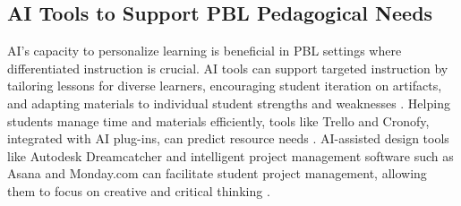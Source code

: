\subsection{AI Tools to Support PBL Pedagogical Needs}

AI's capacity to personalize learning is beneficial in PBL settings where differentiated instruction is crucial. AI tools can support targeted instruction by tailoring lessons for diverse learners, encouraging student iteration on artifacts, and adapting materials to individual student strengths and weaknesses \cite{asrifan2024integrating, kong2024developing, alam2023intelligence}. 
Helping students manage time and materials efficiently, tools like Trello and Cronofy, integrated with AI plug-ins, can predict resource needs  \cite{tanga2024exploration}. 
AI-assisted design tools like Autodesk Dreamcatcher and intelligent project management software such as Asana and Monday.com can facilitate student project management, allowing them to focus on creative and critical thinking \cite{tanga2024exploration}.

